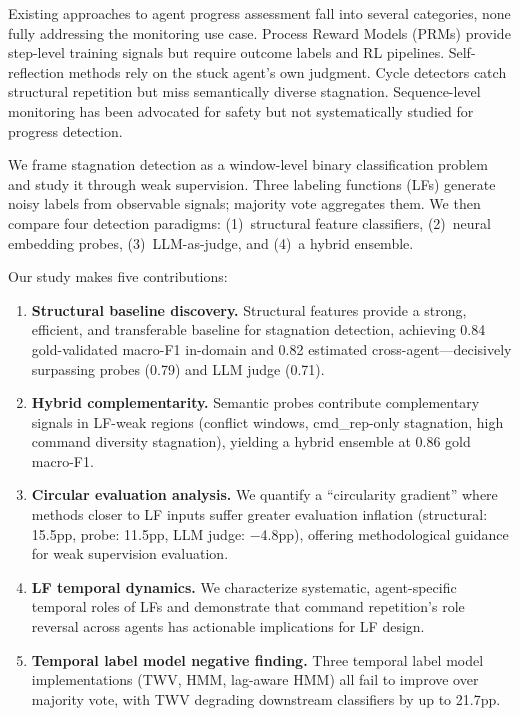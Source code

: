\documentclass[11pt]{article}
\begin{document}
Existing approaches to agent progress assessment fall into several categories, none fully addressing the monitoring use case.
Process Reward Models (PRMs) \citep{agentprm2026,prm2025,toolprmbench2026} provide step-level training signals but require outcome labels and RL pipelines.
Self-reflection methods \citep{shinn2023reflexion,yao2024tree} rely on the stuck agent's own judgment.
Cycle detectors \citep{SpecRA,TrajAD} catch structural repetition but miss semantically diverse stagnation.
Sequence-level monitoring has been advocated for safety \citep{iclr2025monitoring,weaktostrong2025} but not systematically studied for progress detection.

We frame stagnation detection as a window-level binary classification problem and study it through weak supervision.
Three labeling functions (LFs) generate noisy labels from observable signals; majority vote aggregates them.
We then compare four detection paradigms: (1)~structural feature classifiers, (2)~neural embedding probes, (3)~LLM-as-judge, and (4)~a hybrid ensemble.

Our study makes five contributions:
\begin{enumerate}
    \item \textbf{Structural baseline discovery.} Structural features provide a strong, efficient, and transferable baseline for stagnation detection, achieving 0.84 gold-validated macro-F1 in-domain and 0.82 estimated cross-agent---decisively surpassing probes (0.79) and LLM judge (0.71).
    \item \textbf{Hybrid complementarity.} Semantic probes contribute complementary signals in LF-weak regions (conflict windows, cmd\_rep-only stagnation, high command diversity stagnation), yielding a hybrid ensemble at 0.86 gold macro-F1.
    \item \textbf{Circular evaluation analysis.} We quantify a ``circularity gradient'' where methods closer to LF inputs suffer greater evaluation inflation (structural: 15.5pp, probe: 11.5pp, LLM judge: $-$4.8pp), offering methodological guidance for weak supervision evaluation.
    \item \textbf{LF temporal dynamics.} We characterize systematic, agent-specific temporal roles of LFs and demonstrate that command repetition's role reversal across agents has actionable implications for LF design.
    \item \textbf{Temporal label model negative finding.} Three temporal label model implementations (TWV, HMM, lag-aware HMM) all fail to improve over majority vote, with TWV degrading downstream classifiers by up to 21.7pp.
\end{enumerate}
\end{document}
